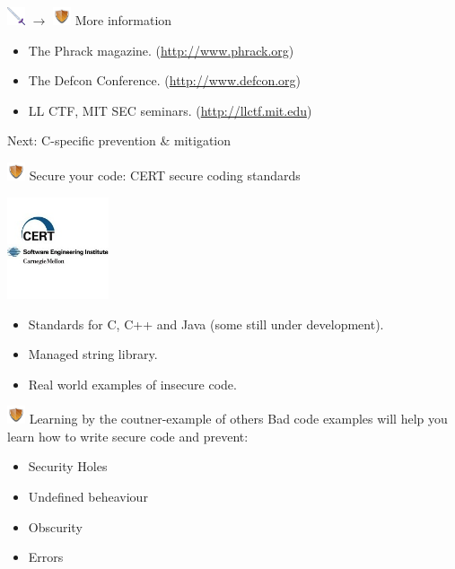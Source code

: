 \documentclass{beamer}
\newcommand{\sword}{\includegraphics[width=15pt]{sword.png} \hspace*{5pt}}
\newcommand{\shield}{\includegraphics[width=15pt]{shield.png} \hspace*{5pt}}
\begin{document}
\begin{frame}{\sword $\rightarrow$ \shield More information}
\begin{itemize}
\item The Phrack magazine. (\url{http://www.phrack.org})
\item The Defcon Conference. (\url{http://www.defcon.org})
\item LL CTF, MIT SEC seminars. (\url{http://llctf.mit.edu})
\end{itemize}
\vspace*{0.8cm}
{\Large Next: C-specific prevention \& mitigation}
\end{frame}


\begin{frame}{\shield Secure your code: CERT secure coding standards}
\begin{center}
\includegraphics[height=3cm]{cert.jpg}
\end{center}
\begin{itemize}
\item Standards for C, C++ and Java (some still under development).
\item Managed string library.
\item Real world examples of insecure code.
\end{itemize}
\end{frame}
\begin{frame}{\shield Learning by the coutner-example of others}
Bad code examples will help you learn how to write secure code and prevent:
\begin{itemize}
\item Security Holes 
\item Undefined beheaviour
\item Obscurity
\item Errors
\end{itemize}
\end{frame}

\end{document}
